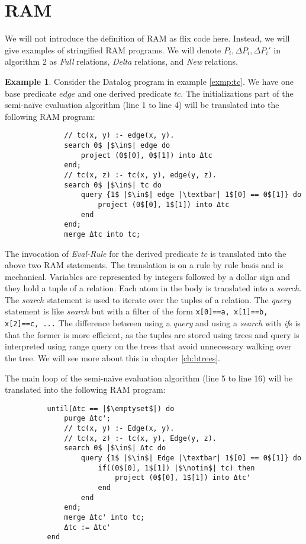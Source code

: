 \documentclass[twoside,11pt,openright]{report}
\theoremstyle{definition}
\newtheorem{exmp}{Example}[chapter]
\begin{document}
\section{RAM}

We will not introduce the definition of RAM as flix code here. Instead, we will give examples
of stringified RAM programs. We will denote $P_i, \Delta P_i, \Delta P_i'$ in algorithm 2 as \textit{Full} relations,
\textit{Delta} relations, and \textit{New} relations.

\begin{exmp}
  Consider the Datalog program in example \ref{exmp:tc}. We have one base predicate $edge$ and one derived predicate $tc$.
  The initializations part of the semi-na\"ive evaluation algorithm (line 1 to line 4) will be translated into the following RAM program:
  \begin{verbatim}
              // tc(x, y) :- edge(x, y).
              search 0$ |$\in$| edge do
                  project (0$[0], 0$[1]) into Δtc
              end;
              // tc(x, z) :- tc(x, y), edge(y, z).
              search 0$ |$\in$| tc do
                  query {1$ |$\in$| edge |\textbar| 1$[0] == 0$[1]} do
                      project (0$[0], 1$[1]) into Δtc
                  end
              end;
              merge Δtc into tc;
  \end{verbatim}
  The invocation of \textit{Eval-Rule} for the derived predicate $tc$ is translated into the above two RAM statements.
  The translation is on a rule by rule basis and is mechanical.
  Variables are represented by integers followed by a dollar sign and they hold a tuple of a relation.
  Each atom in the body is translated into a \textit{search}.
  The \textit{search} statement is used to iterate over the tuples of a relation. The \textit{query} statement
  is like \textit{search} but with a filter of the form \texttt{x[0]==a, x[1]==b, x[2]==c, ...}
  The difference between using a \textit{query} and using a \textit{search} with \textit{if}s is that the former
  is more efficient, as the tuples are stored using trees and query is interpreted using range query on the trees
  that avoid unnecessary walking over the tree. We will see more about this in chapter \ref{ch:btrees}.

  The main loop of the semi-na\"ive evaluation algorithm (line 5 to line 16) will be translated into the following RAM program:
  \begin{verbatim}
          until(Δtc == |$\emptyset$|) do
              purge Δtc';
              // tc(x, y) :- Edge(x, y).
              // tc(x, z) :- tc(x, y), Edge(y, z).
              search 0$ |$\in$| Δtc do
                  query {1$ |$\in$| Edge |\textbar| 1$[0] == 0$[1]} do
                      if((0$[0], 1$[1]) |$\notin$| tc) then
                          project (0$[0], 1$[1]) into Δtc'
                      end
                  end
              end;
              merge Δtc' into tc;
              Δtc := Δtc'
          end
  \end{verbatim}


\end{exmp}
\end{document}
